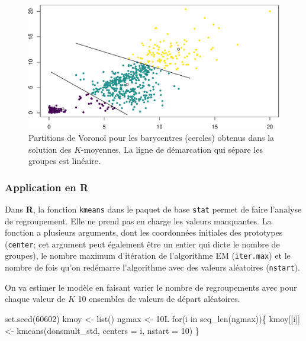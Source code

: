 \documentclass[
  11pt,
  letterpaper,
]{book}
\newenvironment{Shaded}{\begin{snugshade}}{\end{snugshade}}
\newcommand{\AttributeTok}[1]{\textcolor[rgb]{0.40,0.45,0.13}{#1}}
\newcommand{\ControlFlowTok}[1]{\textcolor[rgb]{0.00,0.23,0.31}{#1}}
\newcommand{\DecValTok}[1]{\textcolor[rgb]{0.68,0.00,0.00}{#1}}
\newcommand{\FunctionTok}[1]{\textcolor[rgb]{0.28,0.35,0.67}{#1}}
\newcommand{\NormalTok}[1]{\textcolor[rgb]{0.00,0.23,0.31}{#1}}
\newcommand{\OtherTok}[1]{\textcolor[rgb]{0.00,0.23,0.31}{#1}}
\theoremstyle{definition}
\theoremstyle{remark}
\begin{document}
\begin{figure}[ht!]

{\centering \includegraphics[width=1\textwidth,height=\textheight]{./03-regroupements_files/figure-pdf/fig-voronoikmoy-1.pdf}

}

\caption{\label{fig-voronoikmoy}Partitions de Voronoï pour les
barycentres (cercles) obtenus dans la solution des \(K\)-moyennes. La
ligne de démarcation qui sépare les groupes est linéaire.}

\end{figure}

\hypertarget{application-en-r}{%
\subsubsection{\texorpdfstring{Application en
\textbf{R}}{Application en R}}\label{application-en-r}}

Dans \textbf{R}, la fonction \texttt{kmeans} dans le paquet de base
\texttt{stat} permet de faire l'analyse de regroupement. Elle ne prend
pas en charge les valeurs manquantes. La fonction a plusieurs arguments,
dont les coordonnées initiales des prototypes (\texttt{center}; cet
argument peut également être un entier qui dicte le nombre de groupes),
le nombre maximum d'itération de l'algorithme EM (\texttt{iter.max}) et
le nombre de fois qu'on redémarre l'algorithme avec des valeurs
aléatoires (\texttt{nstart}).

On va estimer le modèle en faisant varier le nombre de regroupements
avec pour chaque valeur de \(K\) 10 ensembles de valeurs de départ
aléatoires.

\begin{Shaded}
\begin{Highlighting}[]
\FunctionTok{set.seed}\NormalTok{(}\DecValTok{60602}\NormalTok{)}
\NormalTok{kmoy }\OtherTok{\textless{}{-}} \FunctionTok{list}\NormalTok{()}
\NormalTok{ngmax }\OtherTok{\textless{}{-}}\NormalTok{ 10L}
\ControlFlowTok{for}\NormalTok{(i }\ControlFlowTok{in} \FunctionTok{seq\_len}\NormalTok{(ngmax))\{}
\NormalTok{ kmoy[[i]] }\OtherTok{\textless{}{-}} \FunctionTok{kmeans}\NormalTok{(donsmult\_std,}
                     \AttributeTok{centers =}\NormalTok{ i,}
                     \AttributeTok{nstart =} \DecValTok{10}\NormalTok{)}
\NormalTok{\}}
\end{Highlighting}
\end{Shaded}
\end{document}
